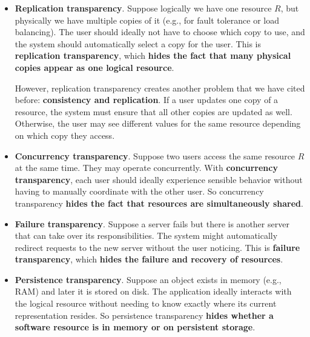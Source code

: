 \begin{itemize}
    \item[\textcolor{Green3}{\faIcon{clone}}] \textcolor{Green3}{\textbf{Replication transparency}}. Suppose logically we have one resource $R$, but physically we have multiple copies of it (e.g., for fault tolerance or load balancing). The user should ideally not have to choose which copy to use, and the system should automatically select a copy for the user. This is \textbf{replication transparency}, which \textbf{hides the fact that many physical copies appear as one logical resource}.

        However, replication transparency creates another problem that we have cited before: \textbf{consistency and replication}. If a user updates one copy of a resource, the system must ensure that all other copies are updated as well. Otherwise, the user may see different values for the same resource depending on which copy they access.

    \item[\textcolor{Green3}{\faIcon{random}}] \textcolor{Green3}{\textbf{Concurrency transparency}}. Suppose two users access the same resource $R$ at the same time. They may operate concurrently. With \textbf{concurrency transparency}, each user should ideally experience sensible behavior without having to manually coordinate with the other user. So concurrency transparency \textbf{hides the fact that resources are simultaneously shared}.

    \item[\textcolor{Green3}{\faIcon{life-ring}}] \textcolor{Green3}{\textbf{Failure transparency}}. Suppose a server fails but there is another server that can take over its responsibilities. The system might automatically redirect requests to the new server without the user noticing. This is \textbf{failure transparency}, which \textbf{hides the failure and recovery of resources}.

    \item[\textcolor{Green3}{\faIcon{database}}] \textcolor{Green3}{\textbf{Persistence transparency}}. Suppose an object exists in memory (e.g., RAM) and later it is stored on disk. The application ideally interacts with the logical resource without needing to know exactly where its current representation resides. So persistence transparency \textbf{hides whether a software resource is in memory or on persistent storage}.
\end{itemize}

